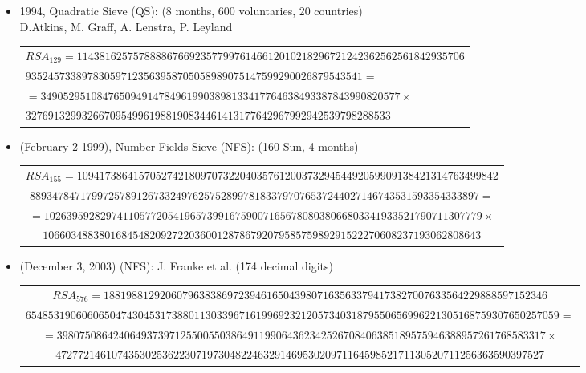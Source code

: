 \documentclass[landscape]{powersem} %
\newcommand{\psd}{\pause}%
\newcommand{\heading}[1]{%
 \begin{center}
  \large\bf
  \Ovalbox{{\textcolor{conceptcolor}{#1}}}%
 \end{center}
 \vspace{1ex minus 1ex}}
\begin{document}
\begin{slide}
\heading{Contemporary Factoring 1/2}\vspace{-4mm}\psd

\begin{itemize}
  \item[\textcolor{blue}{\ding{182}}] 1994, Quadratic Sieve (QS): (8 months, 600 voluntaries, 20 countries)\\
  D.Atkins, M. Graff, A. Lenstra, P. Leyland
\begin{tiny}\begin{tabular}{l}
\hspace*{-1cm}$  RSA_{129} = 114381625757888867669235779976146612010218296721242362562561842935706$\\
\hspace*{5mm}$935245733897830597123563958705058989075147599290026879543541=$\\
$        = 3490529510847650949147849619903898133417764638493387843990820577 \times$\\
$
32769132993266709549961988190834461413177642967992942539798288533
$\end{tabular}\end{tiny}\psd

  \item[\textcolor{blue}{\ding{183}}] (February 2  1999), Number Fields Sieve (NFS): (160 Sun, 4 months)
 \begin{tiny}\begin{tabular}{c}
\hspace*{-1cm}$ RSA_{155} = 109417386415705274218097073220403576120037329454492059909138421314763499842$\\
$88934784717997257891267332497625752899781833797076537244027146743531593354333897=$\\
$=102639592829741105772054196573991675900716567808038066803341933521790711307779
\times$\\
$106603488380168454820927220360012878679207958575989291522270608237193062808643
$\end{tabular}\end{tiny}\psd

  \item[\textcolor{blue}{\ding{184}}] (December 3, 2003) (NFS): J. Franke et al. (174 decimal digits)
 \begin{tiny}\begin{tabular}{c}
\hspace*{-1cm}$ RSA_{576} = 1881988129206079638386972394616504398071635633794173827007633564229888597152346$\\
$65485319060606504743045317388011303396716199692321205734031879550656996221305168759307650257059=$\\
$=398075086424064937397125500550386491199064362342526708406385189575946388957261768583317\times$\\
$472772146107435302536223071973048224632914695302097116459852171130520711256363590397527
$\end{tabular}\end{tiny}\psd


\end{itemize}
\end{slide}
\end{document}
